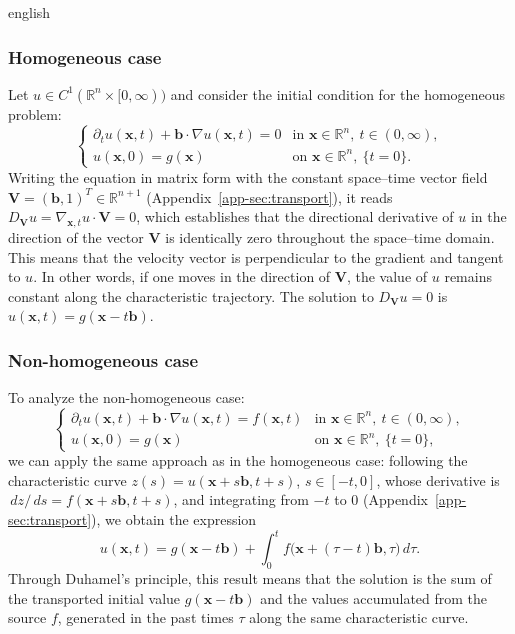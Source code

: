 \begin{hyphenrules}{english}
\subsubsection{Homogeneous case}
Let $u\in C^1(\mathbb{R}^n\times[0,\infty))$ and consider the initial condition for the homogeneous problem:
\begin{equation}
  \begin{cases}
    \partial_t u(\mathbf{x},t)+\mathbf{b}\cdot\nabla u(\mathbf{x},t)=0 & \text{in } \mathbf{x}\in\mathbb{R}^n,\ t\in(0,\infty),\\
    u(\mathbf{x},0)=g(\mathbf{x}) & \text{on } \mathbf{x}\in\mathbb{R}^n,\ \{t=0\}.
  \end{cases}
  \label{eq:transport-hom}
\end{equation}
Writing the equation in matrix form with the constant space--time vector field
$\mathbf{V}=(\mathbf{b},1)^{T}\in\mathbb{R}^{n+1}$ (Appendix~\ref{app-sec:transport}), it reads
$D_{\mathbf{V}}u=\nabla_{\mathbf{x},t}u\cdot\mathbf{V}=0$, which establishes that the directional derivative of $u$ in the direction of the vector $\mathbf{V}$ is
identically zero throughout the space--time domain. This means that the velocity vector is perpendicular
to the gradient and tangent to $u$. In other words, if one moves in the direction of
$\mathbf{V}$, the value of $u$ remains constant along the characteristic trajectory. The solution to
$D_{\mathbf{V}}u=0$ is $u(\mathbf{x},t)=g(\mathbf{x}-t\mathbf{b})$.

\subsubsection{Non-homogeneous case}
To analyze the non-homogeneous case:
\begin{equation}
  \begin{cases}
    \partial_t u(\mathbf{x},t)+\mathbf{b}\cdot\nabla u(\mathbf{x},t)=f(\mathbf{x},t) & \text{in } \mathbf{x}\in\mathbb{R}^n,\ t\in(0,\infty),\\
    u(\mathbf{x},0)=g(\mathbf{x}) & \text{on } \mathbf{x}\in\mathbb{R}^n,\ \{t=0\},
  \end{cases}
  \label{eq:transport-nonhom}
\end{equation}
we can apply the same approach as in the homogeneous case: following the characteristic curve
$z(s)=u(\mathbf{x}+s\mathbf{b},t+s)$, $s\in[-t,0]$, whose derivative is $\,d z/\,d s=f(\mathbf{x}+s\mathbf{b},t+s)$,
and integrating from $-t$ to $0$ (Appendix~\ref{app-sec:transport}), we obtain the expression
\begin{equation}
  u(\mathbf{x},t)=g(\mathbf{x}-t\mathbf{b})+\int_{0}^{t}f\big(\mathbf{x}+(\tau-t)\mathbf{b},\tau\big)\,d\tau.
  \label{eq:transport-duhamel}
\end{equation}
Through Duhamel's principle, this result means that the solution is the sum of the transported initial
value $g(\mathbf{x}-t\mathbf{b})$ and the values accumulated from the source $f$, generated in the past times $\tau$
along the same characteristic curve.


\end{hyphenrules}
